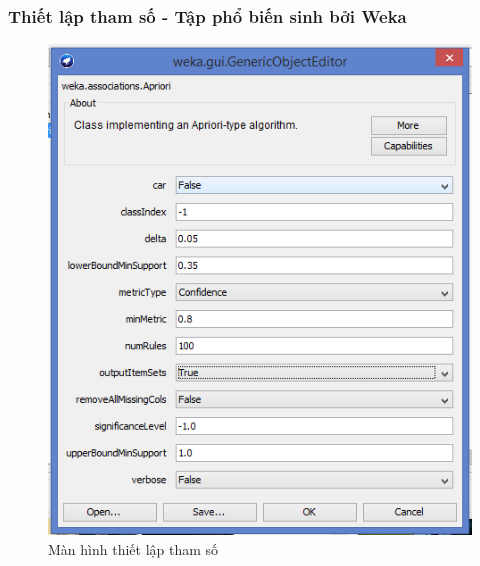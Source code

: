 \documentclass{article}
\begin{document}
\subsubsection{Thiết lập tham số - Tập phổ biến sinh bởi Weka}
\begin{figure}[H]
	\centering
	\caption{Màn hình thiết lập tham số}
	\includegraphics[scale = 0.5]{para}
	
\end{figure}
\end{document}
